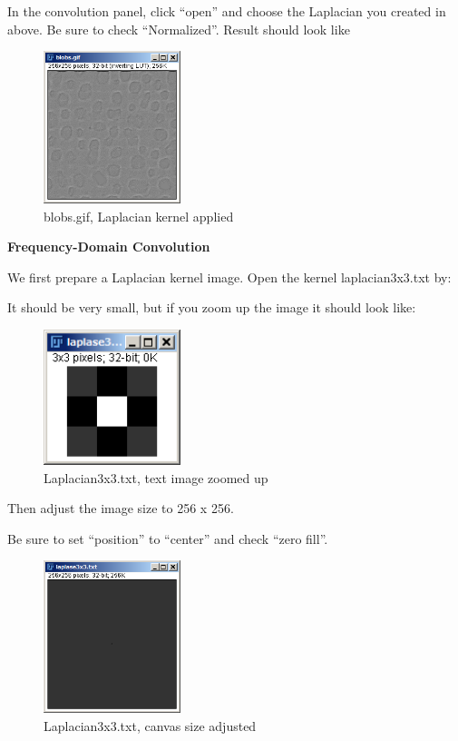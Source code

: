 \begin{indentexercise}{1}
In the convolution panel, click ``open'' and choose the Laplacian you created in
above. Be sure to check ``Normalized''. Result should look like
\begin{figure}[htbp]
\begin{center}
\includegraphics[width=4cm]{fig/fig1_3_fftconvolv2.png}
\caption{ blobs.gif, Laplacian kernel applied}
\label{fig:fftconv2}
\end{center}
\end{figure}

\textbf{Frequency-Domain Convolution}

We first prepare a Laplacian kernel image. Open the kernel
laplacian3x3.txt by:


It should be very small, but if you zoom up the image it should look like:

\begin{figure}[htbp]
\begin{center}
\includegraphics[width=4cm]{fig/fig1_3_fftconvolv3.png}
\caption{ Laplacian3x3.txt, text image zoomed up}
\label{fig:fftconv3}
\end{center}
\end{figure}

Then adjust the image size to 256 x 256. 


Be sure to set ``position'' to ``center'' and check ``zero fill''.

\begin{figure}[htbp]
\begin{center}
\includegraphics[width=4cm]{fig/fig1_3_fftconvolv4.png}
\caption{ Laplacian3x3.txt, canvas size adjusted}
\label{fig:fftconv4}
\end{center}
\end{figure}


\end{indentexercise}
